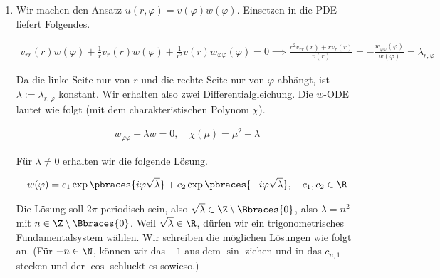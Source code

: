 \begin{comment}
\end{enumerate}

\end{solution}

\end{comment}


\begin{solution}

\phantom{}

\begin{enumerate}[label = (\roman*)]

    \item Wir machen den Ansatz $u(r, \varphi) = v(\varphi) w(\varphi)$.
    Einsetzen in die PDE liefert Folgendes.

    \begin{align*}
        v_{rr}(r) w(\varphi)
        +
        \frac{1}{r}
        v_r(r)w(\varphi)
        +
        \frac{1}{r^2}
        v(r)w_{\varphi\varphi}(\varphi) = 0
        \implies
        \frac
        {
            r^2 v_{rr}(r)
            +
            r   v_r(r)
        }{v(r)}
        =
        -\frac
        {
            w_{\varphi \varphi}(\varphi)
        }{w(\varphi)}
        =
        \lambda_{r, \varphi}
    \end{align*}

    Da die linke Seite nur von $r$ und die rechte Seite nur von $\varphi$ abhängt, ist $\lambda := \lambda_{r, \varphi}$ konstant.
    Wir erhalten also zwei Differentialgleichung.
    Die $w$-ODE lautet wie folgt (mit dem charakteristischen Polynom $\chi$).

    \begin{align*}
        w_{\varphi \varphi} + \lambda w = 0,
        \quad
        \chi(\mu) = \mu^2 + \lambda
    \end{align*}

    Für $\lambda \neq 0$ erhalten wir die folgende Lösung.

    \begin{align*}
        w(\varphi)
        =
        c_1
        \exp \pbraces
        {
            i \varphi \sqrt{\lambda}
        }
        +
        c_2
        \exp \pbraces
        {
            -i \varphi \sqrt{\lambda}
        },
        \quad
        c_1, c_2 \in \R
    \end{align*}

    Die Lösung soll $2 \pi$-periodisch sein, also $\sqrt{\lambda} \in \Z \setminus \Bbraces{0}$, also $\lambda = n^2$ mit $n \in \Z \setminus \Bbraces{0}$.
    Weil $\sqrt{\lambda} \in \R$, dürfen wir ein trigonometrisches Fundamentalsystem wählen.
    Wir schreiben die möglichen Lösungen wie folgt an.
    (Für $-n \in \N$, können wir das $-1$ aus dem $\sin$ ziehen und in das $c_{n, 1}$ stecken und der $\cos$ schluckt es sowieso.)


\end{enumerate}
\end{solution}
